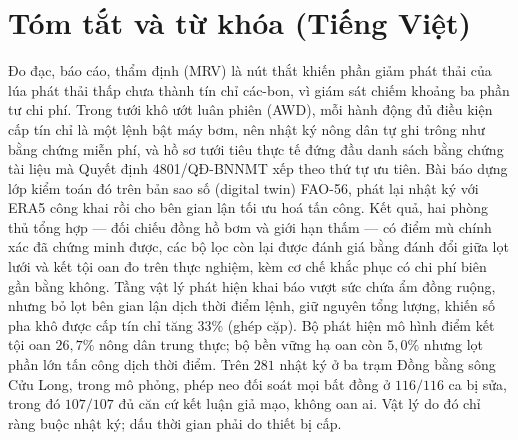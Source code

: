 %
%

\section*{Tóm tắt và từ khóa (Tiếng Việt)}

Đo đạc, báo cáo, thẩm định (MRV) là nút thắt khiến phần giảm phát thải của lúa phát thải thấp chưa thành tín chỉ các-bon, vì giám sát chiếm khoảng ba phần tư chi phí. Trong tưới khô ướt luân phiên (AWD), mỗi hành động đủ điều kiện cấp tín chỉ là một lệnh bật máy bơm, nên nhật ký nông dân tự ghi trông như bằng chứng miễn phí, và hồ sơ tưới tiêu thực tế đứng đầu danh sách bằng chứng tài liệu mà Quyết định 4801/QĐ-BNNMT xếp theo thứ tự ưu tiên. Bài báo dựng lớp kiểm toán đó trên bản sao số (digital twin) FAO-56, phát lại nhật ký với ERA5 công khai rồi cho bên gian lận tối ưu hoá tấn công. Kết quả, hai phòng thủ tổng hợp --- đối chiếu đồng hồ bơm và giới hạn thấm --- có điểm mù
chính xác đã chứng minh được, các bộ lọc còn lại được đánh giá bằng đánh đổi giữa lọt lưới
và kết tội oan đo trên thực nghiệm, kèm cơ chế khắc phục có chi phí biên gần bằng không. Tầng vật lý phát hiện khai báo vượt sức chứa ẩm đồng ruộng, nhưng bỏ lọt bên gian lận dịch thời điểm lệnh, giữ nguyên tổng lượng, khiến số pha khô được cấp tín chỉ tăng $33\%$ (ghép cặp). Bộ phát hiện mô hình điểm kết tội oan $26{,}7\%$ nông dân trung thực; bộ bền vững hạ oan còn $5{,}0\%$ nhưng lọt phần lớn tấn công dịch thời điểm. Trên $281$ nhật ký ở ba trạm Đồng bằng sông Cửu Long, trong mô phỏng, phép neo đối soát mọi bất đồng ở $116/116$ ca bị sửa, trong đó $107/107$ đủ căn cứ kết luận giả mạo, không oan ai. Vật lý do đó chỉ ràng buộc nhật ký; dấu thời gian phải do thiết bị cấp.

